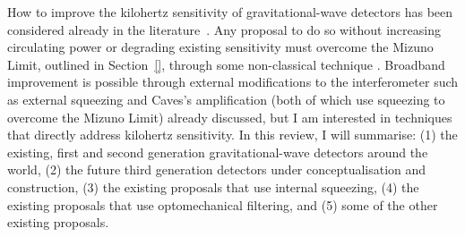 How to improve the kilohertz sensitivity of gravitational-wave detectors has been considered already in the literature~\cite{}. Any proposal to do so without increasing circulating power or degrading existing sensitivity must overcome the Mizuno Limit, outlined in Section~\ref{}, through some non-classical technique . Broadband improvement is possible through external modifications to the interferometer such as external squeezing and Caves's amplification (both of which use squeezing to overcome the Mizuno Limit) already discussed, but I am interested in techniques that directly address kilohertz sensitivity. In this review, I will summarise: (1) the existing, first  and second generation gravitational-wave detectors around the world, (2) the future third generation detectors under conceptualisation and construction, (3) the existing proposals that use internal squeezing, (4) the existing proposals that use optomechanical filtering, and (5) some of the other existing proposals. %

